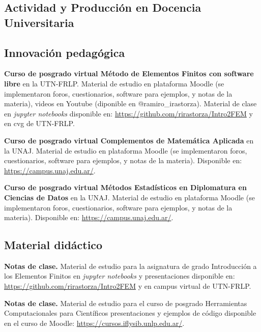 \documentclass[margin,line]{res}
\begin{document}
\begin{resume}
\vspace*{.3in}
\section{ Actividad y Producción en Docencia Universitaria}
\vspace*{-.1in}

\subsection{ Innovación pedagógica}

\textbf{Curso de posgrado virtual Método de Elementos Finitos con software libre} en la UTN-FRLP. Material de estudio en plataforma Moodle (se implementaron foros, cuestionarios, software para ejemplos, y notas de la materia), videos en Youtube (diponible en @ramiro\_irastorza). Material de clase en {\it jupyter notebooks} disponible en: \url{https://github.com/rirastorza/Intro2FEM} y en cvg de UTN-FRLP.

\textbf{Curso de posgrado virtual Complementos de Matemática Aplicada} en la UNAJ. Material de estudio en plataforma Moodle (se implementaron foros, cuestionarios, software para ejemplos, y notas de la materia). Disponible en: \url{https://campus.unaj.edu.ar/}.

\textbf{Curso de posgrado virtual Métodos Estadísticos en Diplomatura en Ciencias de Datos} en la UNAJ. Material de estudio en plataforma Moodle (se implementaron foros, cuestionarios, software para ejemplos, y notas de la materia). Disponible en: \url{https://campus.unaj.edu.ar/}.



\subsection{ Material didáctico}

\textbf{Notas de clase.} Material de estudio para la asignatura de grado Introducción a los Elementos Finitos en {\it jupyter notebooks} y presentaciones disponible en: \url{https://github.com/rirastorza/Intro2FEM} y en campus virtual de UTN-FRLP.

\textbf{Notas de clase.} Material de estudio para el curso de posgrado Herramientas Computacionales para Científicos presentaciones y ejemplos de código disponible en el curso de Moodle: \url{https://cursos.iflysib.unlp.edu.ar/}.
%


\end{resume}
\end{document}
